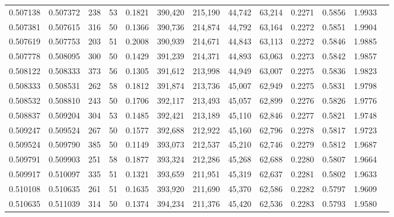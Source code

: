\begin{tabular}{rrrrrrrrrrrrr}
0.507138 & 0.507372 &    238 &    53 &                                     0.1821 & 390,420 & 215,190 &  44,742 &  63,214 & 0.2271 & 0.5856 & 1.9933 \\
0.507381 & 0.507615 &    316 &    50 &                                     0.1366 & 390,736 & 214,874 &  44,792 &  63,164 & 0.2272 & 0.5851 & 1.9904 \\
0.507619 & 0.507753 &    203 &    51 &                                     0.2008 & 390,939 & 214,671 &  44,843 &  63,113 & 0.2272 & 0.5846 & 1.9885 \\
0.507778 & 0.508095 &    300 &    50 &                                     0.1429 & 391,239 & 214,371 &  44,893 &  63,063 & 0.2273 & 0.5842 & 1.9857 \\
0.508122 & 0.508333 &    373 &    56 &                                     0.1305 & 391,612 & 213,998 &  44,949 &  63,007 & 0.2275 & 0.5836 & 1.9823 \\
0.508333 & 0.508531 &    262 &    58 &                                     0.1812 & 391,874 & 213,736 &  45,007 &  62,949 & 0.2275 & 0.5831 & 1.9798 \\
0.508532 & 0.508810 &    243 &    50 &                                     0.1706 & 392,117 & 213,493 &  45,057 &  62,899 & 0.2276 & 0.5826 & 1.9776 \\
0.508837 & 0.509204 &    304 &    53 &                                     0.1485 & 392,421 & 213,189 &  45,110 &  62,846 & 0.2277 & 0.5821 & 1.9748 \\
0.509247 & 0.509524 &    267 &    50 &                                     0.1577 & 392,688 & 212,922 &  45,160 &  62,796 & 0.2278 & 0.5817 & 1.9723 \\
0.509524 & 0.509790 &    385 &    50 &                                     0.1149 & 393,073 & 212,537 &  45,210 &  62,746 & 0.2279 & 0.5812 & 1.9687 \\
0.509791 & 0.509903 &    251 &    58 &                                     0.1877 & 393,324 & 212,286 &  45,268 &  62,688 & 0.2280 & 0.5807 & 1.9664 \\
0.509917 & 0.510097 &    335 &    51 &                                     0.1321 & 393,659 & 211,951 &  45,319 &  62,637 & 0.2281 & 0.5802 & 1.9633 \\
0.510108 & 0.510635 &    261 &    51 &                                     0.1635 & 393,920 & 211,690 &  45,370 &  62,586 & 0.2282 & 0.5797 & 1.9609 \\
0.510635 & 0.511039 &    314 &    50 &                                     0.1374 & 394,234 & 211,376 &  45,420 &  62,536 & 0.2283 & 0.5793 & 1.9580 \\

\end{tabular}
